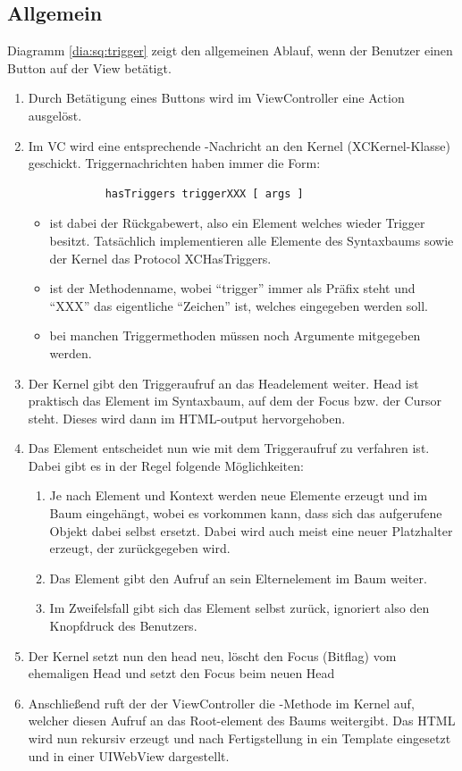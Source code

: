 \subsection{Allgemein}
Diagramm \ref{dia:sq:trigger} zeigt den allgemeinen Ablauf, wenn der Benutzer einen Button auf der View betätigt.
\begin{enumerate}
	\item Durch Betätigung eines Buttons wird im ViewController eine Action ausgelöst.
	\item Im VC wird eine entsprechende -Nachricht an den Kernel (XCKernel-Klasse) geschickt.
		Triggernachrichten haben immer die Form:
		\begin{lstlisting}
			hasTriggers triggerXXX [ args ]
		\end{lstlisting}
		\begin{itemize}
			\item {} ist dabei der Rückgabewert, also ein Element welches wieder Trigger besitzt. Tatsächlich implementieren alle Elemente des Syntaxbaums sowie der Kernel das Protocol XCHasTriggers. 
			\item {} ist der Methodenname, wobei ``trigger'' immer als Präfix steht und ``XXX'' das eigentliche ``Zeichen'' ist, welches eingegeben werden soll.
			\item \code{[ args ]} bei manchen Triggermethoden müssen noch Argumente mitgegeben werden.
		\end{itemize}
	\item Der Kernel gibt den Triggeraufruf an das Headelement weiter. Head ist praktisch das Element im Syntaxbaum, auf dem der Focus bzw. der Cursor steht. Dieses wird dann im HTML-output hervorgehoben.
	\item Das Element entscheidet nun wie mit dem Triggeraufruf zu verfahren ist. 
		Dabei gibt es in der Regel folgende Möglichkeiten:
		\begin{enumerate}[I]
			\item Je nach Element und Kontext werden neue Elemente erzeugt und im Baum eingehängt, 
				wobei es vorkommen kann, dass sich das aufgerufene Objekt dabei selbst ersetzt. 
				Dabei wird auch meist eine neuer Platzhalter erzeugt, der zurückgegeben wird. 
			\item Das Element gibt den Aufruf an sein Elternelement im Baum weiter. 
			\item Im Zweifelsfall gibt sich das Element selbst zurück, ignoriert also den Knopfdruck des Benutzers.
		\end{enumerate}

	\item Der Kernel setzt nun den head neu, löscht den Focus (Bitflag) vom ehemaligen Head und setzt den Focus beim neuen Head
	\item Anschließend ruft der der ViewController die -Methode im Kernel auf, welcher diesen Aufruf an das Root-element des Baums weitergibt. Das HTML wird nun rekursiv erzeugt und nach Fertigstellung in ein Template eingesetzt und in einer UIWebView dargestellt.
\end{enumerate}

